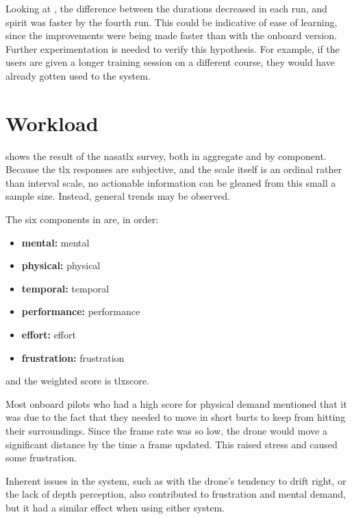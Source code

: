   Looking at , the difference between the durations decreased in each run, and \gls{spirit} was faster by the fourth run.
  This could be indicative of ease of learning, since the improvements were being made faster than with the onboard version.
  Further experimentation is needed to verify this hypothesis.
  For example, if the users are given a longer training session on a different course, they would have already gotten used to the system.

  \section{Workload}
   shows the result of the \gls{nasatlx} survey, both in aggregate and by component.
  Because the \gls{tlx} responses are subjective, and the scale itself is an ordinal rather than interval scale, no actionable information can be gleaned from this small a sample size.\cite{hart2006}
  Instead, general trends may be observed.

  The six components in  are, in order:

  \begin{itemize}
    \item \textbf{\acrshort{mental}:} \acrlong{mental}
    \item \textbf{\acrshort{physical}:} \acrlong{physical}
    \item \textbf{\acrshort{temporal}:} \acrlong{temporal}
    \item \textbf{\acrshort{performance}:} \acrlong{performance}
    \item \textbf{\acrshort{effort}:} \acrlong{effort}
    \item \textbf{\acrshort{frustration}:} \acrlong{frustration}
  \end{itemize}

  \noindent and the weighted score is \acrshort{tlxscore}.
  
  Most onboard pilots who had a high score for physical demand mentioned that it was due to the fact that they needed to move in short burts to keep from hitting their surroundings.
  Since the frame rate was so low, the drone would move a significant distance by the time a frame updated.
  This raised stress and caused some frustration.

  Inherent issues in the system, such as with the drone's tendency to drift right, or the lack of depth perception, also contributed to frustration and mental demand, but it had a similar effect when using either system.

